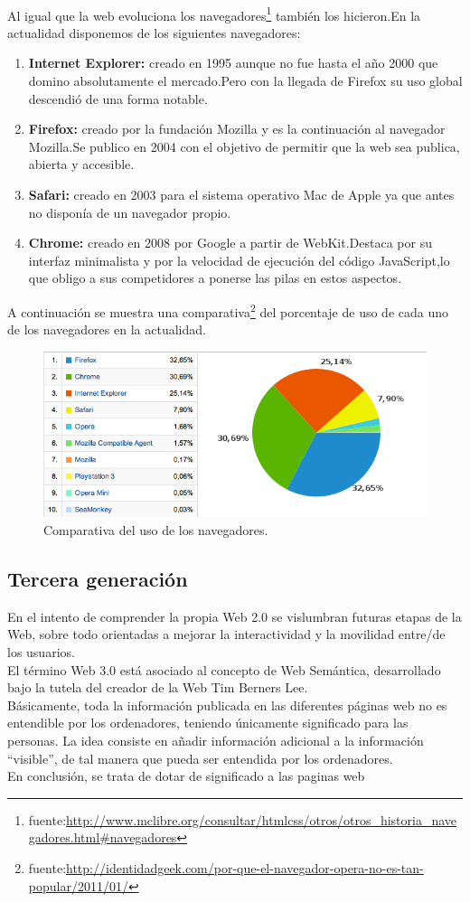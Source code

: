 \\Al igual que la web evoluciona los navegadores\footnote{fuente:\url{http://www.mclibre.org/consultar/htmlcss/otros/otros\_historia\_navegadores.html\#navegadores}} también los hicieron.En la actualidad disponemos de los siguientes navegadores:
\begin{enumerate}
\item \textbf{Internet Explorer:} creado en 1995 aunque no fue hasta el año 2000 que domino absolutamente el mercado.Pero con la llegada de Firefox su uso global descendió de una forma notable.
\item \textbf{Firefox:} creado por la fundación Mozilla y es la continuación al navegador Mozilla.Se publico en 2004 con el objetivo de permitir que la web sea publica, abierta y accesible.
\item \textbf{Safari:} creado en 2003 para el sistema operativo Mac de Apple ya que antes no disponía de un navegador propio.
\item \textbf{Chrome:} creado en 2008 por Google a partir de WebKit.Destaca por su interfaz minimalista y por la velocidad de ejecución del código JavaScript,lo que obligo a sus competidores a ponerse las pilas en estos aspectos.
\end{enumerate}
A continuación se muestra una comparativa\footnote{fuente:\url{http://identidadgeek.com/por-que-el-navegador-opera-no-es-tan-popular/2011/01/}} del porcentaje de uso de cada uno de los navegadores en la actualidad.
\begin{figure}[!h]
\centering
\includegraphics[width=0.4\linewidth]{Figures/uso_navegadores}
\decoRule
\caption[Comparativa del uso de los navegadores]{Comparativa del uso de los navegadores.}
\label{fig:uso_navegadores}
\end{figure}
\subsection*{Tercera generación}
En el intento de comprender la propia Web 2.0 se vislumbran futuras etapas de la Web, sobre todo orientadas a mejorar la interactividad y la movilidad entre/de los usuarios.
\\El término Web 3.0 está asociado al concepto de Web Semántica, desarrollado bajo la tutela del creador de la Web Tim Berners Lee. 
\\Básicamente, toda la información publicada en las diferentes páginas web no es entendible por los ordenadores, teniendo únicamente significado para las personas. La idea consiste en añadir información adicional a la información “visible”, de tal manera que pueda ser entendida por los ordenadores.
\\En conclusión, se trata de dotar de significado a las paginas web
